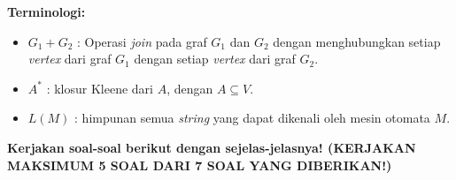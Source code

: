 \documentclass{article}
\begin{document}
\textbf{Terminologi:}
\begin{itemize}
    \item $G_1 + G_2$ : Operasi \textit{join} pada graf $G_1$ dan $G_2$ dengan menghubungkan setiap \textit{vertex} dari graf $G_1$ dengan setiap \textit{vertex} dari graf $G_2$.
    
    \item $A^*$ : klosur Kleene dari $A$, dengan $A \subseteq V$.
    
    \item $L(M)$ : himpunan semua \textit{string} yang dapat dikenali oleh mesin otomata $M$.
\end{itemize}

\textbf{Kerjakan soal-soal berikut dengan sejelas-jelasnya! (KERJAKAN MAKSIMUM 5 SOAL DARI 7 SOAL YANG DIBERIKAN!)}
\end{document}
